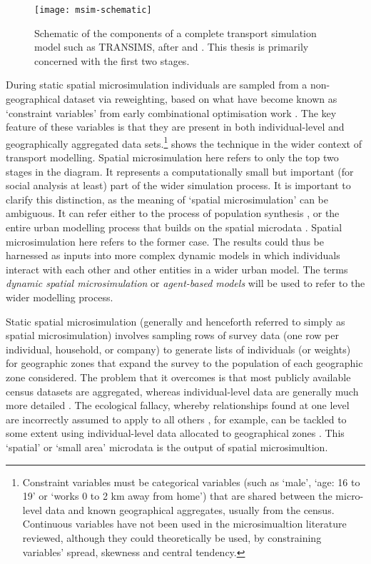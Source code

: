 \begin{figure}[h]
 \centering
 \texttt{[image: msim-schematic]}
 \caption[Schematic a transport simulation model]{Schematic
of the components of a complete transport simulation model such as
TRANSIMS, after \citet{nagel1999transims} and \citet{Mohammadian2010}.
This thesis is primarily concerned with the first two stages.}
 \label{f:msim-schematic}
\end{figure}

During static spatial microsimulation individuals are sampled from a non-geographical
dataset via  reweighting, based on what have become known as `constraint variables'
from early combinational optimisation work \citep{Williamson1998}. The key
feature of these variables is that they are present in
both individual-level and geographically aggregated data
sets.\footnote{Constraint
variables must be categorical variables (such as
`male', `age: 16 to 19' or `works 0 to 2 km away from home')
that are shared between the micro-level data and
known geographical aggregates, usually from the census.
Continuous variables have not been used in the microsimualtion
literature reviewed, although they could theoretically be
used, by constraining variables' spread, skewness
and central tendency.
}
 shows the technique in the wider context of
transport modelling. Spatial microsimulation
here refers to only the top two stages in the diagram. It represents a
computationally small but important (for social analysis at least)
part of the wider simulation process. It is important to clarify this
distinction, as the meaning of `spatial microsimulation' can be ambiguous.
It can refer
either to the process of population synthesis
\citep{chin2006regional, Ballas2005c, Hynes2008},
or the entire urban modelling process that
builds on the spatial microdata \citep{Wegener2011}.
Spatial microsimulation here refers to the former case. The results could
thus be harnessed as inputs into more complex dynamic models in which
individuals interact with each other and other entities in a wider urban model.
The terms \emph{dynamic spatial microsimulation} or \emph{agent-based models}
will be used to refer to the wider modelling process.

Static spatial microsimulation (generally and henceforth referred to simply as
spatial microsimulation) involves sampling rows of
survey data (one row per individual, household, or company) to generate lists of
individuals (or weights) for geographic zones that expand the survey to the
population of each geographic zone considered. The
problem that it overcomes is that most publicly available
census datasets are aggregated, whereas individual-level data are generally
much more detailed \citep{ballas2003microsimulation-30-years}.
The ecological fallacy, whereby relationships found at one level are 
incorrectly assumed to apply to all others \citep{Openshaw1983}, for example, can be tackled
to some extent using individual-level data allocated to geographical zones
\citep{Hermes2012a}. This `spatial' or `small area' microdata is the output
of spatial microsimultion.

